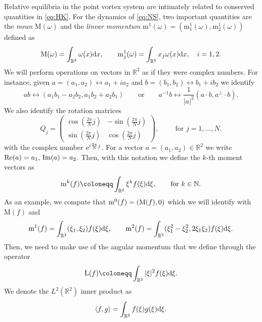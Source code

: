 \documentclass[11pt,reqno,a4paper]{amsart}
\def\dd{{\rm d}}
\def\e{{\rm e}}
\def\RR {\mathbb{R}}
\def\NN {\mathbb{N}}
\def\Re{{\rm Re}}
\def\Im{{\rm Im}}
\newcommand{\mrm}{\mathrm{m}}
\newcommand{\mrM}{\mathrm{M}}
\newcommand{\1}{\mathbbm{1}}
\theoremstyle{definition}
\theoremstyle{definition}
\numberwithin{equation}{section}
\begin{document}
Relative equilibria in the point vortex system are intimately related to conserved quantities in \cref{eq:HK}. For the dynamics of \cref{eq:NS}, two important quantities are the \textit{mean} $\mrM(\omega)$ and the \textit{linear momentum} $\mrm^1(\omega)=(\mrm^1_1(\omega),\mrm^1_2(\omega))$ defined as 
\begin{equation}\label{def:premiers_moments}
    \mrM(\omega)=\int_{\RR^2}\omega(x)\dd x, \qquad \mrm^1_j(\omega)=\int_{\RR^2}x_j\omega(x)\dd x, \quad i=1,2.
\end{equation}
We will perform operations on vectors in $\RR^2$ as if they were complex numbers. For instance, given $a=(a_1,a_2)\leftrightarrow a_1+ia_2 $ and $ b=(b_1,b_2)\leftrightarrow b_1+ib_2$ we identify 
\begin{equation}
\label{def:multiplication}
 ab\leftrightarrow (a_1b_1-a_2b_2, a_1b_2+a_2b_1)\qquad \text{or} \qquad a^{-1}b\leftrightarrow \frac{1}{|a|^2}(a\cdot b, a^\perp \cdot b).
\end{equation}
We also identify the rotation matrices 
\begin{equation}
    \label{def:Qj}
Q_j=\begin{pmatrix}
    \cos(\frac{2\pi}{N}j) & -\sin(\frac{2\pi}{N}j)\\
    \sin(\frac{2\pi}{N}j) &\cos(\frac{2\pi}{N}j) 
\end{pmatrix}, \qquad \text{ for } j=1,\dots, N.
\end{equation}
with the complex number $\e^{i\frac{2\pi}{N}j}$.
For a vector $a=(a_1,a_2)\in \RR^2$ we write $\Re(a)=a_1, \, \Im(a)=a_2$. Then, with this notation we define the $k$-th moment vectors as 
\begin{equation}
    \label{def:mk} {\rm m}^k(f)\coloneqq \int_{\RR^2}\xi^k f(\xi)\dd \xi, \qquad \text{for } k\in \NN.
\end{equation}
As an example, we compute that ${\rm m}^0(f)=({\rm M}(f),0)$ which we will identify with $\mrM(f)$ and
\begin{equation}
    {\rm m}^1(f)=\int_{\RR^2}(\xi_1,\xi_2) f(\xi)\dd \xi, \qquad {\rm m}^2(f)=\int_{\RR^2}(\xi_1^2-\xi_2^2,2\xi_1\xi_2) f(\xi)\dd \xi.
\end{equation}
Then, we need to make use of the angular momentum that we define through the operator 
\begin{align}
\label{def:L}
    \mathrm{L}(f)\coloneqq \int_{\RR^2}|\xi|^2f(\xi)\dd \xi.
\end{align}
We denote the $L^2(\RR^2)$ inner product as 
\begin{align}
    \langle f,g\rangle=\int_{\RR^2} f(\xi)g(\xi)\dd \xi.
\end{align}
\end{document}
